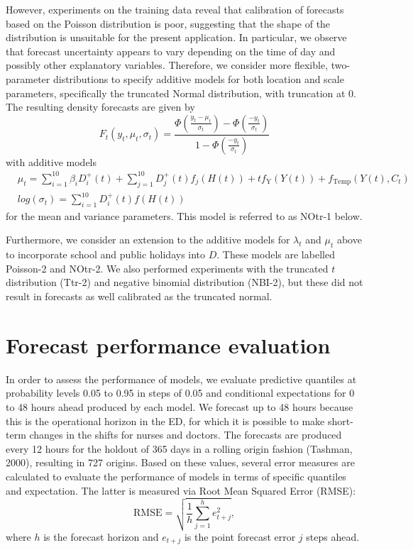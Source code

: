 \documentclass[]{elsarticle} %
\begin{document}
However, experiments on the training data reveal that calibration of
forecasts based on the Poisson distribution is poor, suggesting that the
shape of the distribution is unsuitable for the present application. In
particular, we observe that forecast uncertainty appears to vary
depending on the time of day and possibly other explanatory variables.
Therefore, we consider more flexible, two-parameter distributions to
specify additive models for both location and scale parameters,
specifically the truncated Normal distribution, with truncation at 0.
The resulting density forecasts are given by \begin{equation}
F_t(y_t,\mu_t,\sigma_t) =  \frac{\Phi\left( \frac{y_t-\mu_t}{\sigma_t} \right) - \Phi\left( \frac{-y_t}{\sigma_t} \right)}{1 - \Phi\left( \frac{-y_t}{\sigma_t} \right)}
\label{eq:truncatedn}
\end{equation} with additive models
\begin{align*}
    & \mu_t = \sum_{i=1}^{10} \beta_i D^{+}_i(t) + \sum_{j=1}^{10} D^{+}_j(t) f_j(H(t)) + t f_\text{Y}(Y(t)) + f_\text{Temp}(Y(t),C_t) \\
    & log(\sigma_t) = \sum_{i=1}^{10} D^{+}_i(t) f(H(t))
\end{align*} for the mean and variance parameters. This model is
referred to as NOtr-1 below.

Furthermore, we consider an extension to the additive models for
\(\lambda_t\) and \(\mu_t\) above to incorporate school and public holidays
into \(D\). These models are labelled Poisson-2 and NOtr-2. We also
performed experiments with the truncated \(t\) distribution (Ttr-2) and
negative binomial distribution (NBI-2), but these did not result in
forecasts as well calibrated as the truncated normal.

\hypertarget{accuracy}{%
\section{Forecast performance evaluation}\label{accuracy}}

In order to assess the performance of models, we evaluate predictive
quantiles at probability levels 0.05 to 0.95 in steps of 0.05 and
conditional expectations for 0 to 48 hours ahead produced by each model.
We forecast up to 48 hours because this is the operational horizon in
the ED, for which it is possible to make short-term changes in the
shifts for nurses and doctors. The forecasts are produced every 12 hours
for the holdout of 365 days in a rolling origin fashion (Tashman, 2000),
resulting in 727 origins. Based on these values, several error measures
are calculated to evaluate the performance of models in terms of
specific quantiles and expectation. The latter is measured via Root Mean
Squared Error (RMSE): \begin{equation}
  \mathrm{RMSE} = \sqrt{\frac{1}{h} \sum_{j=1}^h e_{t+j}^2} ,
  \label{eq:RMSE}
\end{equation} where \(h\) is the forecast horizon and \(e_{t+j}\) is the
point forecast error \(j\) steps ahead.
\end{document}
